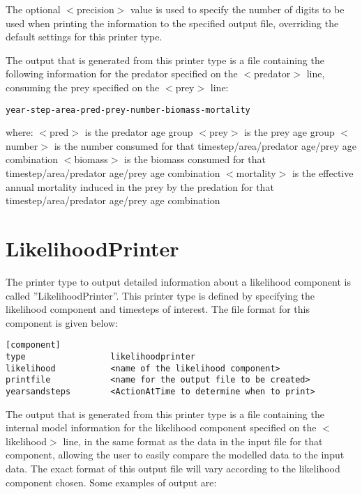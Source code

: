 \documentclass[10pt,twoside]{book}
\begin{document}
The optional $<$precision$>$ value is used to specify the number of digits to be used when printing the information to the specified output file, overriding the default settings for this printer type.

\bigskip
The output that is generated from this printer type is a file containing the following information for the predator specified on the $<$predator$>$ line, consuming the prey specified on the $<$prey$>$ line:

{\small\begin{verbatim}
year-step-area-pred-prey-number-biomass-mortality
\end{verbatim}}

where:\newline
$<$pred$>$ is the predator age group\newline
$<$prey$>$ is the prey age group\newline
$<$number$>$ is the number consumed for that timestep/area/predator age/prey age combination\newline
$<$biomass$>$ is the biomass consumed for that timestep/area/predator age/prey age combination\newline
$<$mortality$>$ is the effective annual mortality induced in the prey by the predation for that timestep/area/predator age/prey age combination

\section{LikelihoodPrinter}\label{sec:likelihoodprinter}
The printer type to output detailed information about a likelihood component is called ''LikelihoodPrinter''.  This printer type is defined by specifying the likelihood component and timesteps of interest.  The file format for this component is given below:

{\small\begin{verbatim}
[component]
type                 likelihoodprinter
likelihood           <name of the likelihood component>
printfile            <name for the output file to be created>
yearsandsteps        <ActionAtTime to determine when to print>
\end{verbatim}}

The output that is generated from this printer type is a file containing the internal model information for the likelihood component specified on the $<$likelihood$>$ line, in the same format as the data in the input file for that component, allowing the user to easily compare the modelled data to the input data.  The exact format of this output file will vary according to the likelihood component chosen.  Some examples of output are:
\end{document}
